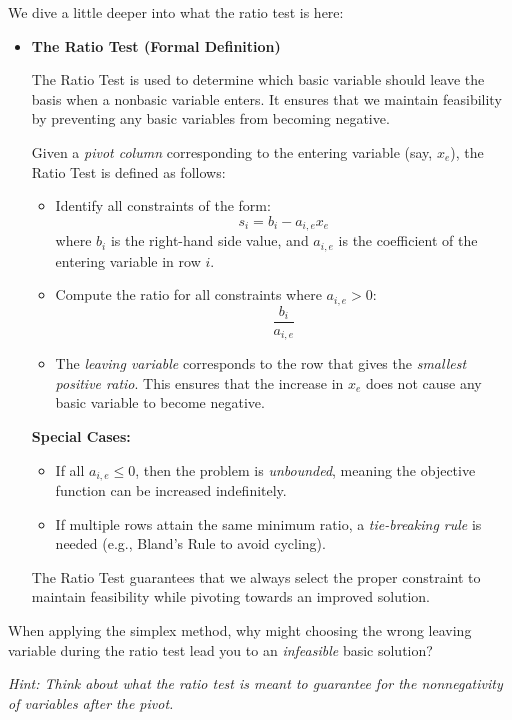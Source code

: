 We dive a little deeper into what the ratio test is here:
\begin{itemize}
    \item \textbf{The Ratio Test (Formal Definition)}  

    The Ratio Test is used to determine which basic variable should leave the basis when a nonbasic variable enters. It ensures that we maintain feasibility by preventing any basic variables from becoming negative.

    Given a \emph{pivot column} corresponding to the entering variable (say, \( x_e \)), the Ratio Test is defined as follows:

    \begin{itemize}
        \item Identify all constraints of the form:
        \[
        s_i = b_i - a_{i,e} x_e
        \]
        where \( b_i \) is the right-hand side value, and \( a_{i,e} \) is the coefficient of the entering variable in row \( i \).
        \item Compute the ratio for all constraints where \( a_{i,e} > 0 \):
        \[
        \frac{b_i}{a_{i,e}}
        \]
        \item The \emph{leaving variable} corresponds to the row that gives the \emph{smallest positive ratio}. This ensures that the increase in \( x_e \) does not cause any basic variable to become negative.
    \end{itemize}

    \textbf{Special Cases:}
    \begin{itemize}
        \item If all \( a_{i,e} \leq 0 \), then the problem is \emph{unbounded}, meaning the objective function can be increased indefinitely.
        \item If multiple rows attain the same minimum ratio, a \emph{tie-breaking rule} is needed (e.g., Bland’s Rule to avoid cycling).
    \end{itemize}

    The Ratio Test guarantees that we always select the proper constraint to maintain feasibility while pivoting towards an improved solution.
\end{itemize}

\begin{learningcheckpoint}[label={lc:ratio-test}]
When applying the simplex method, why might choosing the wrong leaving variable during the ratio test lead you to an \emph{infeasible} basic solution?

\emph{Hint: Think about what the ratio test is meant to guarantee for the nonnegativity of variables after the pivot.}
\end{learningcheckpoint}

